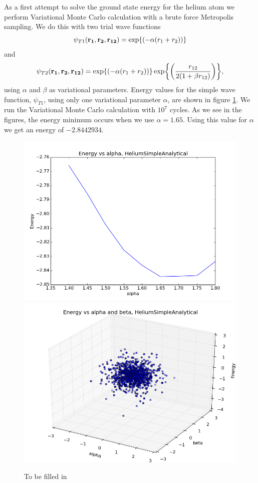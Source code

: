 \documentclass[11pt]{article}
\begin{document}
As a first attempt to solve the ground state energy for the helium
atom we perform Variational Monte Carlo calculation with a brute force
Metropolis sampling. We do this with two trial wave functions
\[
\psi_{T1}({\bf r_{1}},{\bf r_{2}},{\bf r_{12}})=\exp{\left(-\alpha(r_{1}+r_{2})\right)}
\]
and 
\[
\psi_{T2}({\bf r_{1}},{\bf r_{2}},{\bf r_{12}})=\exp{\left(-\alpha(r_{1}+r_{2})\right)}\exp{\left(\frac{r_{12}}{2(1+\beta r_{12})}\right)},
\]
using $\alpha$ and $\beta$ as variational parameters. Energy values
for the simple wave function, $\psi_{T1}$, using only one variational
parameter $\alpha$, are shown in figure \ref{fig01:alpha_Simple}.
We run the Variational Monte Carlo calculation with $10^{7}$ cycles.
As we see in the figures, the energy minimum occurs when we use $\alpha=1.65$.
Using this value for $\alpha$ we get an energy of $-2.8442934$. 

\begin{figure}
\centering \includegraphics[width=0.45\linewidth]{figures/EnergyVsAlphaHeliumSimpleAnalytical}
\includegraphics[width=0.45\linewidth]{figures/VarianceVsAlphaHeliumSimpleAnalytical}
\protect\caption{To be filled in}
\label{fig01:alpha_Simple} 
\end{figure}
\end{document}
